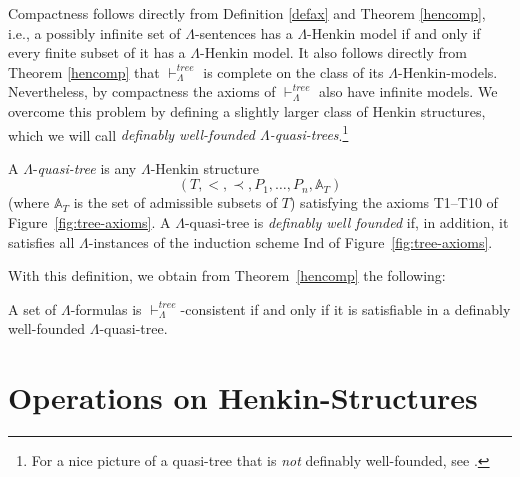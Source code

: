 \documentclass{LMCS}
\begin{document}
Compactness follows directly from Definition \ref{defax} and Theorem
\ref{hencomp}, i.e., a possibly infinite set of $\Lambda$-sentences
has a $\Lambda$-Henkin model if and only if every finite subset of it
has a $\Lambda$-Henkin model. It also follows directly from Theorem
\ref{hencomp} that $\vdash_\Lambda^{tree}$ is complete on the class of
its $\Lambda$-Henkin-models. Nevertheless, by compactness the axioms
of $\vdash_\Lambda^{tree}$ also have infinite models. We overcome this problem by defining a slightly larger class of Henkin structures, which we will call \emph{definably well-founded $\Lambda$-quasi-trees}.\footnote{For a nice picture of a quasi-tree that is \emph{not} definably well-founded, see \cite{1995}.}
\begin{defi}
  A $\Lambda$-\emph{quasi-tree} is any $\Lambda$-Henkin structure $$(T,<,\prec,P_1,\ldots,P_n,\mathbb{A}_T)$$
  (where $\mathbb{A}_T$ is the set of admissible subsets of $T$)
  satisfying the axioms T1--T10 of
  Figure~\ref{fig:tree-axioms}. A $\Lambda$-quasi-tree is \emph{definably
    well founded} if, in addition, it satisfies all $\Lambda$-instances of the
  induction scheme Ind of Figure~\ref{fig:tree-axioms}.
\end{defi}

With this definition, we obtain from Theorem~\ref{hencomp} the following:

\begin{cor}\label{henktreecomp}
A set of $\Lambda$-formulas is $\vdash_\Lambda^{tree}$-consistent if
and only if it is satisfiable in a definably well-founded $\Lambda$-quasi-tree.
\end{cor}

\section{Operations on Henkin-Structures}
\label{sec4}
\end{document}
